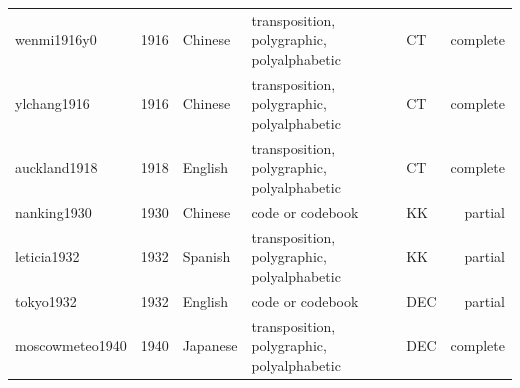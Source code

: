 {\begin{longtable}{@{}lrlllr@{}}
wenmi1916y0 & 1916 & Chinese & transposition, polygraphic, polyalphabetic & CT & complete \\
ylchang1916 & 1916 & Chinese & transposition, polygraphic, polyalphabetic & CT & complete \\
auckland1918 & 1918 & English & transposition, polygraphic, polyalphabetic & CT & complete \\
nanking1930 & 1930 & Chinese & code or codebook & KK & partial \\
leticia1932 & 1932 & Spanish & transposition, polygraphic, polyalphabetic & KK & partial \\
tokyo1932 & 1932 & English & code or codebook & DEC & partial \\
moscowmeteo1940 & 1940 & Japanese & transposition, polygraphic, polyalphabetic & DEC & complete \\
\end{longtable}}
